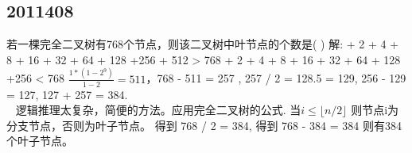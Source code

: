 \subsection{2011408}
若一棵完全二叉树有768个节点，则该二叉树中叶节点的个数是(   )\newline
解: + 2 + 4 + 8 + 16 + 32 + 64 + 128 +256 + 512 > 768 + 2 + 4 + 8 + 16 + 32 + 64 + 128 +256 < 768\newline
$\frac{1*(1-2^9)}{1-2} = 511$，768 - 511 = 257 , 257 / 2 = 128.5 = 129, 256 - 129 = 127, 127 + 257 = 384.\newline
\\~ 
逻辑推理太复杂，简便的方法。应用完全二叉树的公式.  $ 当 i \le \lfloor n/2 \rfloor $ 则节点i为分支节点，否则为叶子节点。\newline
得到 768 / 2 = 384, 得到  768 - 384 = 384 则有384个叶子节点。\newline


